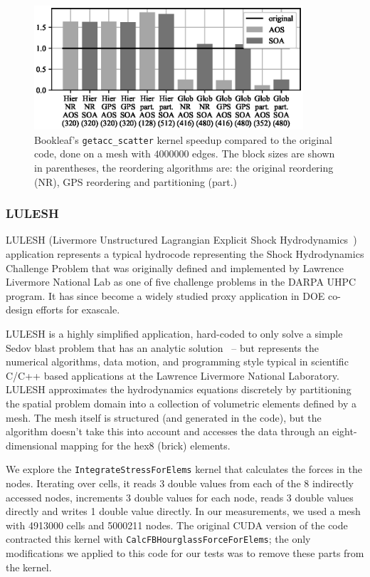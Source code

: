 \begin{figure}[Htbp]
\centering
\includegraphics[width=10cm]{fig/bookleaf_speedup.eps}
\caption{Bookleaf's \texttt{getacc\_scatter} kernel speedup compared to the 
original code, done on a mesh with $4000000$ edges. The block sizes are shown 
in parentheses, the reordering algorithms are: the original reordering (NR), 
GPS reordering and partitioning (part.)}
  \label{fig:bookleaf_speedup}
\end{figure}


\subsubsection{LULESH}\label{sec:lulesh-summary}


\noindent LULESH (Livermore Unstructured Lagrangian Explicit Shock 
Hydrodynamics~\cite{LULESH2:changes}) application represents a typical 
hydrocode representing the Shock Hydrodynamics Challenge Problem that was 
originally defined and implemented by Lawrence Livermore National Lab as one of 
five challenge problems in the DARPA UHPC program. It  has since become a widely 
studied proxy application in DOE co-design efforts for exascale. 

LULESH is a highly simplified application, hard-coded to only solve a simple
Sedov blast problem that has an analytic solution~\cite{LULESH:spec} – but
represents the numerical algorithms, data motion, and programming style typical
in scientific C/C++ based applications at the Lawrence Livermore National
Laboratory. LULESH approximates the hydrodynamics equations discretely by
partitioning the spatial problem domain into a collection of volumetric elements
defined by a mesh. The mesh itself is structured (and generated in the code), 
but the algorithm doesn't take this into account and accesses the data through 
an eight-dimensional mapping for the hex8 (brick) elements.

We explore the \texttt{IntegrateStressForElems} kernel that calculates the
forces in the nodes. Iterating over cells, it reads 3 double values from each 
of the 8 indirectly accessed nodes, increments 3 double values for each node, 
reads 3 double values directly and writes 1 double value directly. In our 
measurements, we used a mesh with \num{4913000} cells and \num{5000211}
nodes. The original CUDA version of the code contracted this kernel with
\texttt{CalcFBHourglassForceForElems}; the only modifications we applied to 
this code for our tests was to remove these parts from the kernel.

